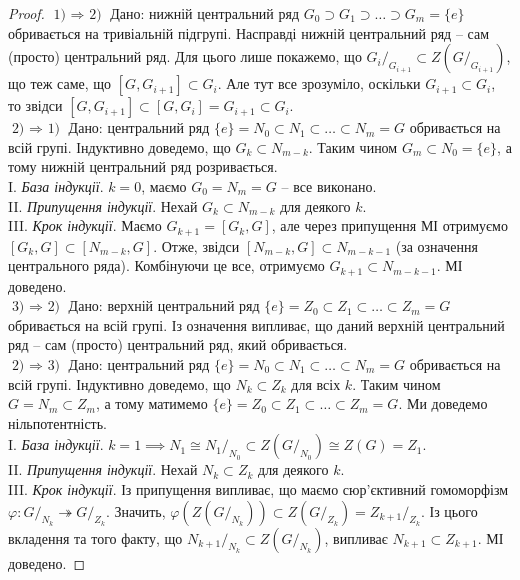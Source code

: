 \documentclass{math_library}
\begin{document}
\begin{proof}
$\boxed{\text{1) $\Rightarrow$ 2)}}$ Дано: нижній центральний ряд $G_0 \supset G_1 \supset \dots \supset G_m = \{e\}$ обривається на тривіальній підгрупі. Насправді нижній центральний ряд -- сам (просто) центральний ряд. Для цього лише покажемо, що ${G_i}/_{G_{i+1}} \subset Z(G/_{G_{i+1}})$, що теж саме, що $[G, G_{i+1}] \subset G_i$. Але тут все зрозуміло, оскільки $G_{i+1} \subset G_i$, то звідси $[G,G_{i+1}] \subset [G,G_{i}] = G_{i+1} \subset G_i$.
\bigskip \\
$\boxed{\text{2) $\Rightarrow$ 1)}}$ Дано: центральний ряд $\{e\} = N_0 \subset N_1 \subset \dots \subset N_m = G$ обривається на всій групі. Індуктивно доведемо, що $G_{k} \subset N_{m-k}$. Таким чином $G_m \subset N_0 = \{e\}$, а тому нижній центральний ряд розривається.\\
I. \textit{База індукції}. $k = 0$, маємо $G_0 = N_m = G$ -- все виконано.\\
II. \textit{Припущення індукції}. Нехай $G_k \subset N_{m-k}$ для деякого $k$.\\
III. \textit{Крок індукції}. Маємо $G_{k+1} = [G_k,G]$, але через припущення МІ отримуємо $[G_k,G] \subset [N_{m-k}, G]$. Отже, звідси $[N_{m-k}, G] \subset N_{m-k-1}$ (за означення центрального ряда). Комбінуючи це все, отримуємо $G_{k+1} \subset N_{m-k-1}$. МІ доведено.
\bigskip \\
$\boxed{\text{3) $\Rightarrow$ 2)}}$ Дано: верхній центральний ряд $\{e\} = Z_0 \subset Z_1 \subset \dots \subset Z_m = G$ обривається на всій групі. Із означення випливає, що даний верхній центральний ряд -- сам (просто) центральний ряд, який обривається.
\bigskip \\
$\boxed{\text{2) $\Rightarrow$ 3)}}$ Дано: центральний ряд $\{e\} = N_0 \subset N_1 \subset \dots \subset N_m = G$ обривається на всій групі. Індуктивно доведемо, що $N_k \subset Z_k$ для всіх $k$. Таким чином $G = N_m \subset Z_m$, а тому матимемо $\{e\} = Z_0 \subset Z_1 \subset \dots \subset Z_m = G$. Ми доведемо нільпотентність.\\
I. \textit{База індукції}. $k = 1 \implies N_1 \cong {N_1}/_{N_0} \subset Z\left(G/_{N_0}\right) \cong Z(G) = Z_1$.\\
II. \textit{Припущення індукції}. Нехай $N_k \subset Z_k$ для деякого $k$.\\
III. \textit{Крок індукції}. Із припущення випливає, що маємо сюр'єктивний гомоморфізм $\varphi \colon G/_{N_k} \twoheadrightarrow G/_{Z_k}$. Значить, $\varphi(Z(G/_{N_k})) \subset Z(G/_{Z_k}) = {Z_{k+1}}/_{Z_k}$. Із цього вкладення та того факту, що ${N_{k+1}}/_{N_k} \subset Z(G/_{N_k})$, випливає $N_{k+1} \subset Z_{k+1}$. МІ доведено.
\end{proof}
\end{document}
